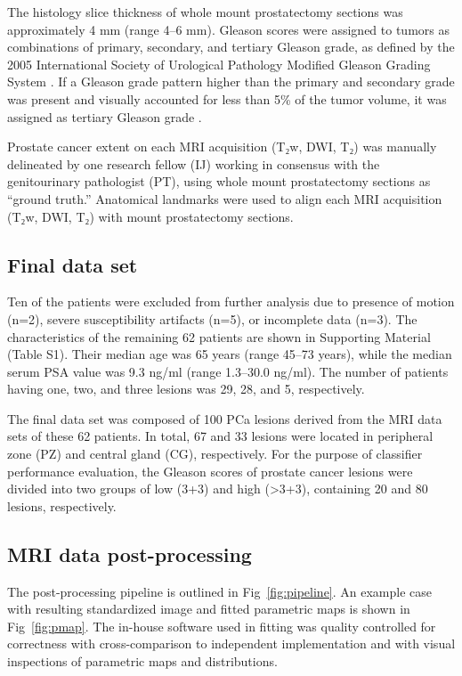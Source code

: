 \documentclass[10pt,letterpaper]{article}
\newcommand{\citep}{\cite}
\begin{document}
The histology slice thickness of whole mount prostatectomy sections was
approximately 4 mm (range 4--6 mm). Gleason scores were assigned to tumors as
combinations of primary, secondary, and tertiary Gleason grade, as defined by
the 2005 International Society of Urological Pathology Modified Gleason Grading
System \citep{Epstein2005}. If a Gleason grade pattern higher than the primary
and secondary grade was present and visually accounted for less than 5\% of the
tumor volume, it was assigned as tertiary Gleason grade \citep{Epstein2010}.

Prostate cancer extent on each MRI acquisition (T₂w, DWI, T₂) was manually
delineated by one research fellow (IJ) working in consensus with the
genitourinary pathologist (PT), using whole mount prostatectomy sections as
``ground truth.'' Anatomical landmarks were used to align each MRI acquisition
(T₂w, DWI, T₂) with mount prostatectomy sections.


\subsection{Final data set}

Ten of the patients were excluded from further analysis due to presence of
motion (n=2), severe susceptibility artifacts (n=5), or incomplete data (n=3).
The characteristics of the remaining 62 patients are shown in Supporting
Material (Table S1). Their median age was 65 years (range 45--73 years), while
the median serum PSA value was 9.3 ng/ml (range 1.3--30.0 ng/ml). The number of
patients having one, two, and three lesions was 29, 28, and 5, respectively.

The final data set was composed of 100 PCa lesions derived from the MRI data
sets of these 62 patients. In total, 67 and 33 lesions were located in
peripheral zone (PZ) and central gland (CG), respectively. For the purpose of
classifier performance evaluation, the Gleason scores of prostate cancer lesions
were divided into two groups of low (3+3) and high (>3+3), containing 20 and 80
lesions, respectively.


\subsection{MRI data post-processing}

The post-processing pipeline is outlined in Fig~\ref{fig:pipeline}. An
example case with resulting standardized image and fitted parametric maps is
shown in Fig~\ref{fig:pmap}. The in-house software used in fitting was
quality controlled for correctness with cross-comparison to independent
implementation and with visual inspections of parametric maps and distributions.
\end{document}
